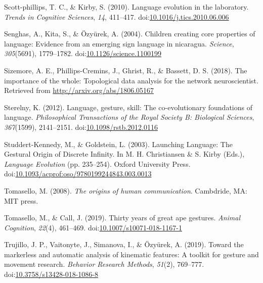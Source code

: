 \documentclass[
  man, noextraspace,floatsintext]{apa6}
\newlength{\cslhangindent}
\newenvironment{cslreferences}%
  {\setlength{\parindent}{0pt}%
  \everypar{\setlength{\hangindent}{\cslhangindent}}\ignorespaces}%
  {\par}
\begin{document}
\begin{cslreferences}
\leavevmode\hypertarget{ref-scott-phillipsLanguageEvolutionLaboratory2010}{}%
Scott-phillips, T. C., \& Kirby, S. (2010). Language evolution in the laboratory. \emph{Trends in Cognitive Sciences}, \emph{14}, 411--417. doi:\href{https://doi.org/10.1016/j.tics.2010.06.006}{10.1016/j.tics.2010.06.006}

\leavevmode\hypertarget{ref-senghasChildrenCreatingCore2004}{}%
Senghas, A., Kita, S., \& Özyürek, A. (2004). Children creating core properties of language: Evidence from an emerging sign language in nicaragua. \emph{Science}, \emph{305}(5691), 1779--1782. doi:\href{https://doi.org/10.1126/science.1100199}{10.1126/science.1100199}

\leavevmode\hypertarget{ref-sizemoreImportanceWholeTopological2018}{}%
Sizemore, A. E., Phillips-Cremins, J., Ghrist, R., \& Bassett, D. S. (2018). The importance of the whole: Topological data analysis for the network neuroscientist. Retrieved from \url{http://arxiv.org/abs/1806.05167}

\leavevmode\hypertarget{ref-sterelnyLanguageGestureSkill2012}{}%
Sterelny, K. (2012). Language, gesture, skill: The co-evolutionary foundations of language. \emph{Philosophical Transactions of the Royal Society B: Biological Sciences}, \emph{367}(1599), 2141--2151. doi:\href{https://doi.org/10.1098/rstb.2012.0116}{10.1098/rstb.2012.0116}

\leavevmode\hypertarget{ref-studdert-kennedyLaunchingLanguageGestural2003}{}%
Studdert-Kennedy, M., \& Goldstein, L. (2003). Launching Language: The Gestural Origin of Discrete Infinity. In M. H. Christiansen \& S. Kirby (Eds.), \emph{Language Evolution} (pp. 235--254). Oxford University Press. doi:\href{https://doi.org/10.1093/acprof:oso/9780199244843.003.0013}{10.1093/acprof:oso/9780199244843.003.0013}

\leavevmode\hypertarget{ref-tomaselloOriginsHumanCommunication2008}{}%
Tomasello, M. (2008). \emph{The origins of human communication}. Cambdride, MA: MIT press.

\leavevmode\hypertarget{ref-tomaselloThirtyYearsGreat2019}{}%
Tomasello, M., \& Call, J. (2019). Thirty years of great ape gestures. \emph{Animal Cognition}, \emph{22}(4), 461--469. doi:\href{https://doi.org/10.1007/s10071-018-1167-1}{10.1007/s10071-018-1167-1}

\leavevmode\hypertarget{ref-trujilloMarkerlessAutomaticAnalysis2019}{}%
Trujillo, J. P., Vaitonyte, J., Simanova, I., \& Özyürek, A. (2019). Toward the markerless and automatic analysis of kinematic features: A toolkit for gesture and movement research. \emph{Behavior Research Methods}, \emph{51}(2), 769--777. doi:\href{https://doi.org/10.3758/s13428-018-1086-8}{10.3758/s13428-018-1086-8}


\end{cslreferences}
\end{document}
